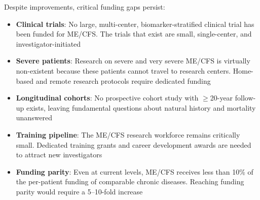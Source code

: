 Despite improvements, critical funding gaps persist:

\begin{itemize}
    \item \textbf{Clinical trials}: No large, multi-center, biomarker-stratified clinical trial has been funded for ME/CFS. The trials that exist are small, single-center, and investigator-initiated
    \item \textbf{Severe patients}: Research on severe and very severe ME/CFS is virtually non-existent because these patients cannot travel to research centers. Home-based and remote research protocols require dedicated funding
    \item \textbf{Longitudinal cohorts}: No prospective cohort study with $\geq$20-year follow-up exists, leaving fundamental questions about natural history and mortality unanswered
    \item \textbf{Training pipeline}: The ME/CFS research workforce remains critically small. Dedicated training grants and career development awards are needed to attract new investigators
    \item \textbf{Funding parity}: Even at current levels, ME/CFS receives less than 10\% of the per-patient funding of comparable chronic diseases. Reaching funding parity would require a 5--10-fold increase
\end{itemize}

